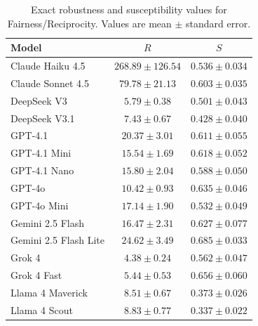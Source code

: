 \begin{table}[p!]
  \centering
  \caption{Exact robustness and susceptibility values for Fairness/Reciprocity. Values are mean $\pm$ standard error.}
  \label{tab:metric_values_fairness_reciprocity}
  \small
  \begin{tabular}{lcc}
    \toprule
    Model & $R$ & $S$ \\
    \midrule
    Claude Haiku 4.5 & $268.89 \pm 126.54$ & $0.536 \pm 0.034$ \\
    Claude Sonnet 4.5 & $79.78 \pm 21.13$ & $0.603 \pm 0.035$ \\
    DeepSeek V3 & $5.79 \pm 0.38$ & $0.501 \pm 0.043$ \\
    DeepSeek V3.1 & $7.43 \pm 0.67$ & $0.428 \pm 0.040$ \\
    GPT-4.1 & $20.37 \pm 3.01$ & $0.611 \pm 0.055$ \\
    GPT-4.1 Mini & $15.54 \pm 1.69$ & $0.618 \pm 0.052$ \\
    GPT-4.1 Nano & $15.80 \pm 2.04$ & $0.588 \pm 0.050$ \\
    GPT-4o & $10.42 \pm 0.93$ & $0.635 \pm 0.046$ \\
    GPT-4o Mini & $17.14 \pm 1.90$ & $0.532 \pm 0.049$ \\
    Gemini 2.5 Flash & $16.47 \pm 2.31$ & $0.627 \pm 0.077$ \\
    Gemini 2.5 Flash Lite & $24.62 \pm 3.49$ & $0.685 \pm 0.033$ \\
    Grok 4 & $4.38 \pm 0.24$ & $0.562 \pm 0.047$ \\
    Grok 4 Fast & $5.44 \pm 0.53$ & $0.656 \pm 0.060$ \\
    Llama 4 Maverick & $8.51 \pm 0.67$ & $0.373 \pm 0.026$ \\
    Llama 4 Scout & $8.83 \pm 0.77$ & $0.337 \pm 0.022$ \\
    \bottomrule
  \end{tabular}
\end{table}

